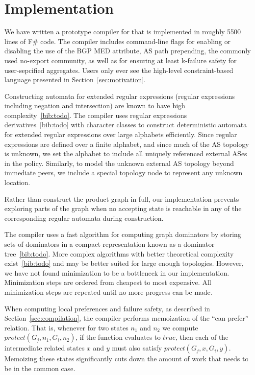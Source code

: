 \section{Implementation}
\label{sec:implementation}

We have written a prototype compiler for \sysname that is implemented in roughly 5500 lines of F\# code. The compiler includes command-line flags for enabling or disabling the use of the BGP MED attribute, AS path prepending, the commonly used no-export community, as well as for ensuring at least k-failure safety for user-sepcified aggregates. Users only ever see the high-level constraint-based language presented in Section~\ref{sec:motivation}.


Constructing automata for extended regular expressions (regular expressions including negation and intersection) are known to have high complexity~\ref{bib:todo}. The \sysname compiler uses regular expressions derivatives~\ref{bib:todo} with character classes to construct deterministic automata for extended regular expressions over large alphabets efficiently. Since regular expressions are defined over a finite alphabet, and since much of the AS topology is unknown, we set the alphabet to include all uniquely referenced external ASes in the policy. Similarly, to model the unknown external AS topology beyond immediate peers, we include a special topology node to represent any unknown location.

Rather than construct the product graph in full, our implementation prevents exploring parts of the graph when no accepting state is reachable in any of the corresponding regular automata during construction.


The \sysname compiler uses a fast algorithm for computing graph dominators by storing sets of dominators in a compact representation known as a dominator tree~\ref{bib:todo}. More complex algorithms with better theoretical complexity exist~\ref{bib:todo} and may be better suited for large enough topologies. However, we have not found minimization to be a bottleneck in our implementation. Minimization steps are ordered from cheapest to most expensive. All minimization steps are repeated until no more progress can be made.


When computing local preferences and failure safety, as described in Section~\ref{sec:compilation}, the compiler performs memoization of the ``can prefer'' relation. That is, whenever for two states $n_1$ and $n_2$ we compute $protect(G_j, n_1, G_i, n_2)$, if the function evaluates to $true$, then each of the intermediate related states $x$ and $y$ must also satisfy $protect(G_j, x, G_i, y)$. Memoizing these states significantly cuts down the amount of work that needs to be in the common case.

